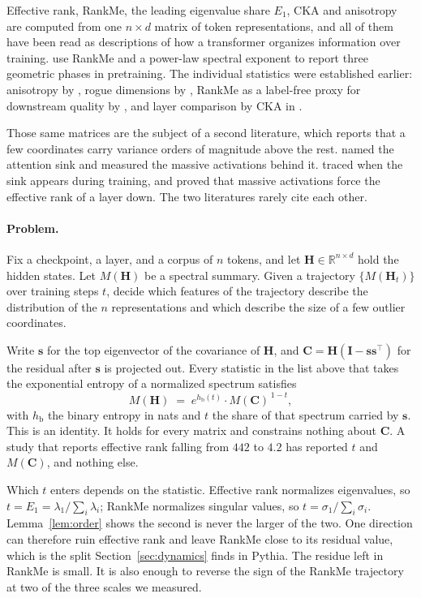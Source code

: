 \documentclass{article}
\theoremstyle{spaced}
\theoremstyle{definition}
\newcommand{\bH}{\mathbf{H}}
\newcommand{\bC}{\mathbf{C}}
\newcommand{\bs}{\mathbf{s}}
\newcommand{\bI}{\mathbf{I}}
\newcommand{\hb}{h_{\mathrm{b}}}
\begin{document}
Effective rank, RankMe, the leading eigenvalue share $E_1$, CKA and anisotropy are computed from one $n \times d$ matrix of token representations, and all of them have been read as descriptions of how a transformer organizes information over training. \citet{li2025tracing} use RankMe and a power-law spectral exponent to report three geometric phases in pretraining. The individual statistics were established earlier: anisotropy by \citet{ethayarajh2019contextual}, rogue dimensions by \citet{timkey2021all}, RankMe as a label-free proxy for downstream quality by \citet{garrido2023rankme}, and layer comparison by CKA in \citet{raghu2021vision}.

Those same matrices are the subject of a second literature, which reports that a few coordinates carry variance orders of magnitude above the rest. \citet{xiao2024efficient} named the attention sink and \citet{sun2024massive} measured the massive activations behind it. \citet{gu2025attention} traced when the sink appears during training, and \citet{queipodellano2025sinks} proved that massive activations force the effective rank of a layer down. The two literatures rarely cite each other.

\paragraph{Problem.} Fix a checkpoint, a layer, and a corpus of $n$ tokens, and let $\bH \in \mathbb{R}^{n \times d}$ hold the hidden states. Let $M(\bH)$ be a spectral summary. Given a trajectory $\{M(\bH_t)\}$ over training steps $t$, decide which features of the trajectory describe the distribution of the $n$ representations and which describe the size of a few outlier coordinates.

Write $\bs$ for the top eigenvector of the covariance of $\bH$, and $\bC = \bH(\bI - \bs\bs^\top)$ for the residual after $\bs$ is projected out. Every statistic in the list above that takes the exponential entropy of a normalized spectrum satisfies
\begin{equation}
\label{eq:teaser}
M(\bH) \;=\; e^{\hb(t)}\cdot M(\bC)^{\,1 - t},
\end{equation}
with $\hb$ the binary entropy in nats and $t$ the share of that spectrum carried by $\bs$. This is an identity. It holds for every matrix and constrains nothing about $\bC$. A study that reports effective rank falling from $442$ to $4.2$ has reported $t$ and $M(\bC)$, and nothing else.

Which $t$ enters depends on the statistic. Effective rank normalizes eigenvalues, so $t = E_1 = \lambda_1/\sum_i\lambda_i$; RankMe normalizes singular values, so $t = \sigma_1/\sum_i\sigma_i$. Lemma~\ref{lem:order} shows the second is never the larger of the two. One direction can therefore ruin effective rank and leave RankMe close to its residual value, which is the split Section~\ref{sec:dynamics} finds in Pythia. The residue left in RankMe is small. It is also enough to reverse the sign of the RankMe trajectory at two of the three scales we measured.
\end{document}

